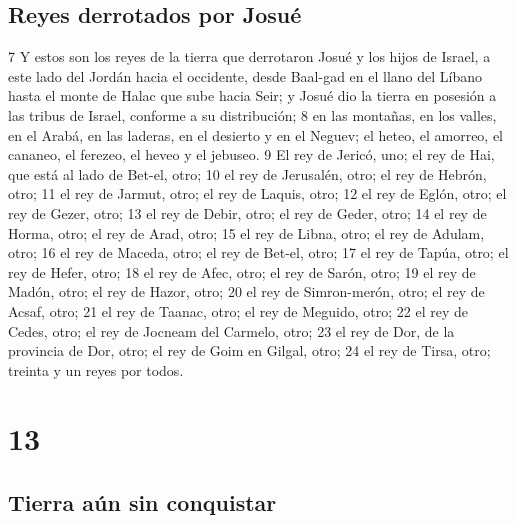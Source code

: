 \section*{Reyes derrotados por Josué}

7 Y estos son los reyes de la tierra que derrotaron Josué y los hijos de Israel, a este lado del Jordán hacia el occidente, desde Baal-gad en el llano del Líbano hasta el monte de Halac que sube hacia Seir; y Josué dio la tierra en posesión a las tribus de Israel, conforme a su distribución;
8 en las montañas, en los valles, en el Arabá, en las laderas, en el desierto y en el Neguev; el heteo, el amorreo, el cananeo, el ferezeo, el heveo y el jebuseo.
9 El rey de Jericó, uno; el rey de Hai, que está al lado de Bet-el, otro;
10 el rey de Jerusalén, otro; el rey de Hebrón, otro;
11 el rey de Jarmut, otro; el rey de Laquis, otro;
12 el rey de Eglón, otro; el rey de Gezer, otro;
13 el rey de Debir, otro; el rey de Geder, otro;
14 el rey de Horma, otro; el rey de Arad, otro;
15 el rey de Libna, otro; el rey de Adulam, otro;
16 el rey de Maceda, otro; el rey de Bet-el, otro;
17 el rey de Tapúa, otro; el rey de Hefer, otro;
18 el rey de Afec, otro; el rey de Sarón, otro;
19 el rey de Madón, otro; el rey de Hazor, otro;
20 el rey de Simron-merón, otro; el rey de Acsaf, otro;
21 el rey de Taanac, otro; el rey de Meguido, otro;
22 el rey de Cedes, otro; el rey de Jocneam del Carmelo, otro;
23 el rey de Dor, de la provincia de Dor, otro; el rey de Goim en Gilgal, otro;
24 el rey de Tirsa, otro; treinta y un reyes por todos.

\chapter{13}

\section*{Tierra aún sin conquistar}

